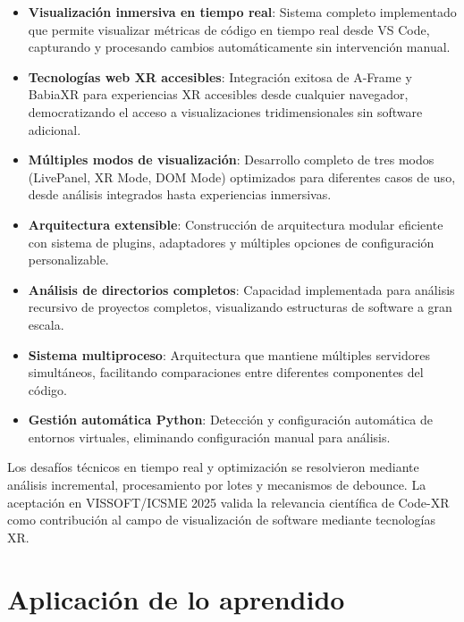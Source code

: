 \documentclass[a4paper, 12pt]{book}
\begin{document}
\begin{itemize}
  \item \textbf{Visualización inmersiva en tiempo real}: Sistema completo implementado que permite visualizar métricas de código en tiempo real desde VS Code, capturando y procesando cambios automáticamente sin intervención manual.
  
  \item \textbf{Tecnologías web XR accesibles}: Integración exitosa de A-Frame y BabiaXR para experiencias XR accesibles desde cualquier navegador, democratizando el acceso a visualizaciones tridimensionales sin software adicional.
  
  \item \textbf{Múltiples modos de visualización}: Desarrollo completo de tres modos (LivePanel, XR Mode, DOM Mode) optimizados para diferentes casos de uso, desde análisis integrados hasta experiencias inmersivas.
  
  \item \textbf{Arquitectura extensible}: Construcción de arquitectura modular eficiente con sistema de plugins, adaptadores y múltiples opciones de configuración personalizable.
  
  \item \textbf{Análisis de directorios completos}: Capacidad implementada para análisis recursivo de proyectos completos, visualizando estructuras de software a gran escala.
  
  \item \textbf{Sistema multiproceso}: Arquitectura que mantiene múltiples servidores simultáneos, facilitando comparaciones entre diferentes componentes del código.
  
  \item \textbf{Gestión automática Python}: Detección y configuración automática de entornos virtuales, eliminando configuración manual para análisis.
\end{itemize}

Los desafíos técnicos en tiempo real y optimización se resolvieron mediante análisis incremental, procesamiento por lotes y mecanismos de debounce. La aceptación en VISSOFT/ICSME 2025 valida la relevancia científica de Code-XR como contribución al campo de visualización de software mediante tecnologías XR.

\section{Aplicación de lo aprendido}
\label{sec:aplicacion}
\end{document}
